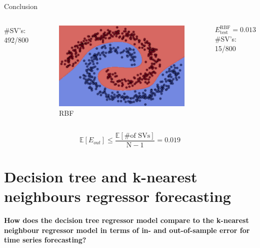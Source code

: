\documentclass[9.5pt]{beamer}
\begin{document}
\begin{frame}{Conclusion}
\begin{columns}[onlytextwidth]
            #SV’s: 492/800
            \centering
            \begin{figure}
                \centering
                \includegraphics[width=\linewidth]{image-20220624192258535}
                \caption{RBF}
            \end{figure}
            \[E_{\text{test}}^{\text{RBF}} = 0.013\]
            #SV’s: 15/800
        \end{columns}

        \bigskip
        \bigskip

        \small
        \[\mathbb{E}[E_{out}] \le \frac{\mathbb{E}[\text{\# of SVs}]}{\text{N} - 1} = 0.019\]
    \end{frame}


    \section{Decision tree and k-nearest neighbours regressor forecasting}
    \begin{frame}
        \textbf{How does the decision tree regressor model compare to the k-nearest neighbour regressor model in terms of in- and out-of-sample error for time series forecasting?}
    \end{frame}
\end{document}
